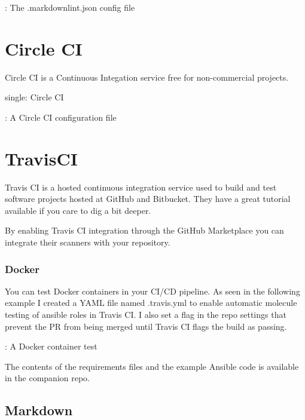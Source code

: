 \justify
\begin{mybox}{\thetcbcounter: The .markdownlint.json config file}
	
\end{mybox}

\section{Circle CI}

Circle CI is a Continuous Integation service free for non-commercial
projects.

single: Circle CI

\justify
\begin{mybox}{\thetcbcounter: A Circle CI configuration file}
	 
\end{mybox}

\section{TravisCI}

\justify
Travis CI is a hosted continuous integration service used to build and
test software projects hosted at GitHub and Bitbucket. They have a great
tutorial available
if you care to dig a bit deeper.

\justify
By enabling Travis CI integration through the GitHub Marketplace you
can integrate their scanners with your repository.

\subsubsection{Docker}

\justify
You can test Docker containers in your CI/CD pipeline. As seen in the
following example I created a YAML file named .travis.yml to enable
automatic molecule testing of ansible roles in Travis CI. I also set a
flag in the repo settings that prevent the PR from being merged until
Travis CI flags the build as passing.

\justify
\begin{mybox}{\thetcbcounter: A Docker container test}
	
\end{mybox}

The contents of the requirements files and the example Ansible code is
available in the companion repo.


\subsection{Markdown}

